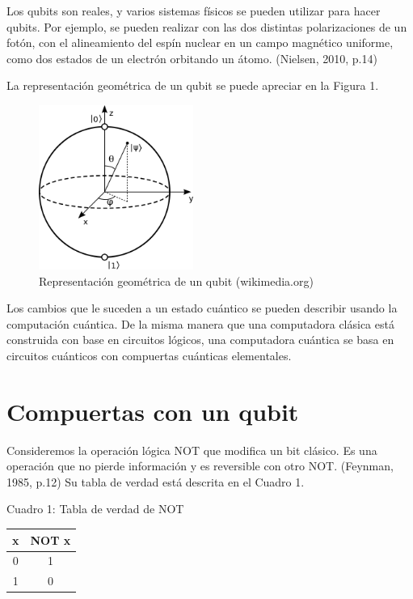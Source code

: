 \documentclass[11pt,a4paper]{article}
\begin{document}
Los qubits son reales, y varios sistemas físicos se pueden utilizar para hacer qubits. Por ejemplo, se pueden realizar con las dos distintas polarizaciones de un fotón, con el alineamiento del espín nuclear en un campo magnético uniforme, como dos estados de un electrón orbitando un átomo. (Nielsen, 2010, p.14) 

La representación geométrica de un qubit se puede apreciar en la Figura 1.

\begin{figure}
\centering
\includegraphics[width=0.45\textwidth]{qubit}
\caption{Representación geométrica de un qubit (wikimedia.org)}
\end{figure}

Los cambios que le suceden a un estado cuántico se pueden describir usando la computación cuántica. De la misma manera que una computadora clásica está construida con base en circuitos lógicos, una computadora cuántica se basa en circuitos cuánticos con compuertas cuánticas elementales.
 
\section*{Compuertas con un qubit}

Consideremos la operación lógica NOT que modifica un bit clásico. Es una operación que no pierde información y es reversible con otro NOT. (Feynman, 1985, p.12)
Su tabla de verdad está descrita en el Cuadro 1.

Cuadro 1: Tabla de verdad de NOT
\begin{center}
    \begin{tabular}{ c | c }
    x & NOT x \\ 
	\hline
    0 & 1\\ 
    1 & 0 \\ 
    \end{tabular}
\end{center}
\end{document}

